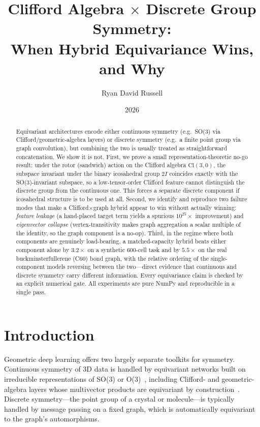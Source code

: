 \documentclass[10pt]{article}
\title{\textbf{Clifford Algebra $\times$ Discrete Group Symmetry:\\When Hybrid Equivariance Wins, and Why}}
\author{Ryan David Russell}
\affil{Kaleidoworks}
\date{2026}
\begin{document}
\maketitle

\begin{abstract}
Equivariant architectures encode either continuous symmetry (e.g.\ SO(3) via Clifford/geometric-algebra layers) or discrete symmetry (e.g.\ a finite point group via graph convolution), but combining the two is usually treated as straightforward concatenation.
We show it is not.
First, we prove a small representation-theoretic no-go result: under the rotor (sandwich) action on the Clifford algebra $\mathrm{Cl}(3,0)$, the subspace invariant under the binary icosahedral group $2I$ coincides exactly with the SO(3)-invariant subspace, so a low-tensor-order Clifford feature cannot distinguish the discrete group from the continuous one.
This forces a separate discrete component if icosahedral structure is to be used at all.
Second, we identify and reproduce two failure modes that make a Clifford$\times$graph hybrid appear to win without actually winning: \emph{feature leakage} (a hand-placed target term yields a spurious $10^{25}\times$ improvement) and \emph{eigenvector collapse} (vertex-transitivity makes graph aggregation a scalar multiple of the identity, so the graph component is a no-op).
Third, in the regime where both components are genuinely load-bearing, a matched-capacity hybrid beats either component alone by $3.2\times$ on a synthetic 600-cell task and by $5.5\times$ on the real buckminsterfullerene (C60) bond graph, with the relative ordering of the single-component models reversing between the two---direct evidence that continuous and discrete symmetry carry different information.
Every equivariance claim is checked by an explicit numerical gate.
All experiments are pure NumPy and reproducible in a single pass.
\end{abstract}

\section{Introduction}

Geometric deep learning offers two largely separate toolkits for symmetry.
Continuous symmetry of 3D data is handled by equivariant networks built on irreducible representations of SO(3) or O(3)~\cite{thomas2018,fuchs2020,bronstein2021}, including Clifford- and geometric-algebra layers whose multivector products are equivariant by construction~\cite{ruhe2023,brehmer2023,dehaan2024}.
Discrete symmetry---the point group of a crystal or molecule---is typically handled by message passing on a fixed graph, which is automatically equivariant to the graph's automorphisms.
\end{document}
